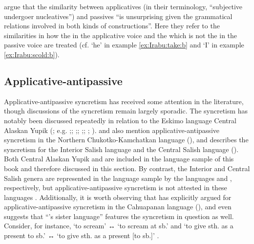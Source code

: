 \cite[244]{zuniga:kittila:2019} argue that the similarity between applicatives (in their terminology, “subjective undergoer nucleatives”) and passives “is unsurprising given the grammatical relations involved in both kinds of constructions”. Here they refer to the similarities in how the  in the applicative voice and the  which is not the  in the passive voice are treated (cf.  ‘he’ in example \ref{ex:Irabu:take:b} and  ‘I’ in example \ref{ex:Irabu:scold:b}).

\subsection{Applicative-antipassive} \label{sec:simple-syncretism:appl-antp}
Applicative-antipassive syncretism has received some attention in the literature, though discussions of the syncretism remain largely sporadic. The syncretism has notably been discussed repeatedly in relation to the Eskimo language Central Alaskan Yupik (; e.g. \citealt[121f.]{malchukov:2015};; \citeyear[405ff.]{malchukov:2016};; \citeyear[13ff.]{malchukov:2017};; \citealt[243]{zuniga:kittila:2019}; \citealt[210ff.]{basilico:2019}). \citeauthor{malchukov:2015} and \citeauthor{zuniga:kittila:2019} also mention applicative-antipassive syncretism in the Northern Chukotko-Kamchatkan language  (), and \citeauthor{malchukov:2015} describes the syncretism for the Interior Salish language  and the Central Salish language  (). Both Central Alaskan Yupik and  are included in the language sample of this book and therefore discussed in this section. By contrast, the Interior and Central Salish genera are represented in the language sample by the languages  and , respectively, but applicative-antipassive syncretism is not attested in these languages \citep{willett:2003, suttles:2004}. Additionally, it is worth observing that \cite[524ff.]{valenzuela:2016} has explicitly argued for applicative-antipassive syncretism in the Cahuapanan language  (), and even suggests that “’s sister language”  features the syncretism in question as well. Consider, for instance,   ‘to scream’ ↔  ‘to scream at sb.’ and  ‘to give sth. as a present to sb.’ ↔  ‘to give sth. as a present [to sb.]’ \citep[524f.]{valenzuela:2016}.

